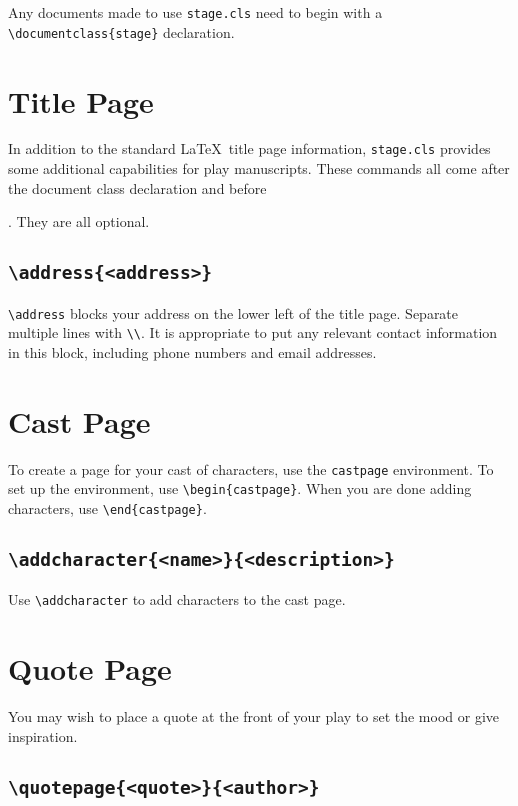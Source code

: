 \documentclass{report}
\begin{document}
Any documents made to use \texttt{stage.cls} need to begin with a \verb|\documentclass{stage}| declaration.

\section{Title Page}
In addition to the standard \LaTeX\ title page information, \texttt{stage.cls} provides some additional capabilities for play manuscripts. These commands all come after the document class declaration and before \maketitle. They are all optional.

\cprotect\subsection{\verb|\address{<address>}|}
\verb|\address| blocks your address on the lower left of the title page. Separate multiple lines with \verb|\\|. It is appropriate to put any relevant contact information in this block, including phone numbers and email addresses.

\section{Cast Page}
To create a page for your cast of characters, use the \texttt{castpage} environment. To set up the environment, use \verb|\begin{castpage}|. When you are done adding characters, use \verb|\end{castpage}|.

\cprotect\subsection{\verb|\addcharacter{<name>}{<description>}|}
Use \verb|\addcharacter| to add characters to the cast page.

\section{Quote Page}

You may wish to place a quote at the front of your play to set the mood or give inspiration.

\cprotect\subsection{\verb|\quotepage{<quote>}{<author>}|}
\end{document}
